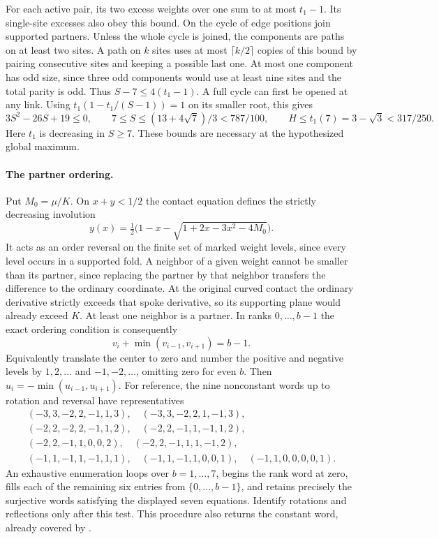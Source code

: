 \documentclass[11pt,a4paper]{article}
\theoremstyle{definition}
\begin{document}
For each active pair, its two excess weights over one sum to at most
$t_1-1$. Its single-site excesses also obey this bound. On the cycle
of edge positions join supported partners. Unless the whole cycle is
joined, the components are paths on at least two sites. A path on $k$
sites uses at most $\lceil k/2\rceil$ copies of this bound by pairing
consecutive sites and keeping a possible last one. At most one component
has odd size, since three odd components would use at least nine sites
and the total parity is odd. Thus $S-7\le4(t_1-1)$. A full cycle can
first be opened at any link. Using $t_1(1-t_1/(S-1))=1$ on its smaller
root, this gives
\begin{equation}\label{eq:seven-total}
 3S^2-26S+19\le0,\qquad 7\le S\le(13+4\sqrt7)/3<787/100,
 \qquad H\le t_1(7)=3-\sqrt3<317/250 .
\end{equation}
Here $t_1$ is decreasing in $S\ge7$. These bounds are necessary at
the hypothesized global maximum.

\paragraph{The partner ordering.}
Put $M_0=\mu/K$. On $x+y<1/2$ the contact equation defines the
strictly decreasing involution
\[
 y(x)=\tfrac12\big(1-x-\sqrt{1+2x-3x^2-4M_0}\big).
\]
It acts as an order reversal on the finite set of marked weight levels,
since every level occurs in a supported fold. A neighbor of a given
weight cannot be smaller than its partner, since replacing the partner by
that neighbor transfers the difference to the ordinary coordinate.
At the original curved contact the ordinary derivative strictly exceeds
that spoke derivative, so its supporting plane would already exceed $K$.
At least one neighbor is a partner. In ranks $0,\ldots,b-1$ the exact
ordering condition is consequently
\[
 v_i+\min(v_{i-1},v_{i+1})=b-1 .
\]
Equivalently translate the center to zero and number the positive and
negative levels by $1,2,\ldots$ and $-1,-2,\ldots$, omitting zero for
even $b$. Then $u_i=-\min(u_{i-1},u_{i+1})$. For reference, the nine
nonconstant words up to rotation and reversal have representatives
\[
\begin{gathered}
(-3,3,-2,2,-1,1,3),\quad(-3,3,-2,2,1,-1,3),\\
(-2,2,-2,2,-1,1,2),\quad(-2,2,-1,1,-1,1,2),\\
(-2,2,-1,1,0,0,2),\quad(-2,2,-1,1,1,-1,2),\\
(-1,1,-1,1,-1,1,1),\quad(-1,1,-1,1,0,0,1),\quad
(-1,1,0,0,0,0,1).
\end{gathered}
\]
An exhaustive enumeration loops over $b=1,\ldots,7$, begins the rank
word at zero, fills each of the remaining six entries from
$\{0,\ldots,b-1\}$, and retains precisely the surjective words satisfying
the displayed seven equations. Identify rotations and reflections only
after this test. This procedure also returns the constant word, already
covered by \cite{Jiang}.
\end{document}
